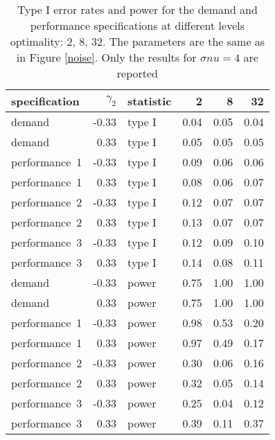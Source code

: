 \begin{table}[ht]
\centering
\begingroup\footnotesize
\begin{tabular}{lrlrrr}
  \hline
specification & $\gamma_2$ & statistic & 2 & 8 & 32 \\ 
  \hline
demand & -0.33 & type I & 0.04 & 0.05 & 0.04 \\ 
  demand & 0.33 & type I & 0.05 & 0.05 & 0.05 \\ 
  performance~1 & -0.33 & type I & 0.09 & 0.06 & 0.06 \\ 
  performance~1 & 0.33 & type I & 0.08 & 0.06 & 0.07 \\ 
  performance~2 & -0.33 & type I & 0.12 & 0.07 & 0.07 \\ 
  performance~2 & 0.33 & type I & 0.13 & 0.07 & 0.07 \\ 
  performance~3 & -0.33 & type I & 0.12 & 0.09 & 0.10 \\ 
  performance~3 & 0.33 & type I & 0.14 & 0.08 & 0.11 \\ 
  demand & -0.33 & power & 0.75 & 1.00 & 1.00 \\ 
  demand & 0.33 & power & 0.75 & 1.00 & 1.00 \\ 
  performance~1 & -0.33 & power & 0.98 & 0.53 & 0.20 \\ 
  performance~1 & 0.33 & power & 0.97 & 0.49 & 0.17 \\ 
  performance~2 & -0.33 & power & 0.30 & 0.06 & 0.16 \\ 
  performance~2 & 0.33 & power & 0.32 & 0.05 & 0.14 \\ 
  performance~3 & -0.33 & power & 0.25 & 0.04 & 0.12 \\ 
  performance~3 & 0.33 & power & 0.39 & 0.11 & 0.37 \\ 
   \hline
\end{tabular}
\endgroup
\caption{Type I error rates and power for the demand and
             performance specifications at different levels optimality: 
             2, 8, 32. The parameters are the same as in Figure \ref{noise}.
             Only the results for $\sigma{nu} = 4$ are reported} 
\label{noise-table}
\end{table}
